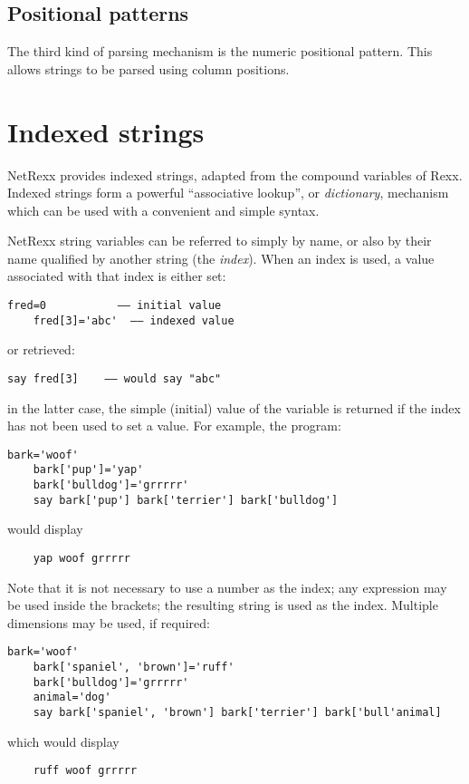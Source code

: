 \subsection{Positional patterns}
The third kind of parsing mechanism is the numeric positional pattern. This allows strings to be parsed using column positions.
\section{Indexed strings}
NetRexx provides indexed strings, adapted from the compound variables of Rexx. Indexed strings form a powerful “associative lookup”, or \emph{dictionary}, mechanism which can be used with a convenient and simple syntax.

NetRexx string variables can be referred to simply by name, or also by
their name qualified by another string (the \emph{index}). When an index is
used, a value associated with that index is either set:
\begin{lstlisting}[label=index,caption=Index]
    fred=0           –– initial value
    fred[3]='abc'  –– indexed value
\end{lstlisting}
or retrieved:
\begin{lstlisting}[label=retrieving,caption=Retrieving]
    say fred[3]    –– would say "abc"
\end{lstlisting}
in the latter case, the simple (initial) value of the variable is
returned if the index has not been used to set a value. For example,
the program:
\begin{lstlisting}[label=woof,caption=Woof]
    bark='woof'
    bark['pup']='yap'
    bark['bulldog']='grrrrr'
    say bark['pup'] bark['terrier'] bark['bulldog']
\end{lstlisting}
would display
\begin{verbatim}
    yap woof grrrrr
\end{verbatim}
Note that it is not necessary to use a number as the index; any
expression may be used inside the brackets; the resulting string is
used as the index. Multiple dimensions may be used, if required:
\begin{lstlisting}[label=dimensions,caption=Multiple Dimensions]
    bark='woof'
    bark['spaniel', 'brown']='ruff'
    bark['bulldog']='grrrrr'
    animal='dog'
    say bark['spaniel', 'brown'] bark['terrier'] bark['bull'animal]
\end{lstlisting}
which would display
\begin{verbatim}
    ruff woof grrrrr
\end{verbatim}
